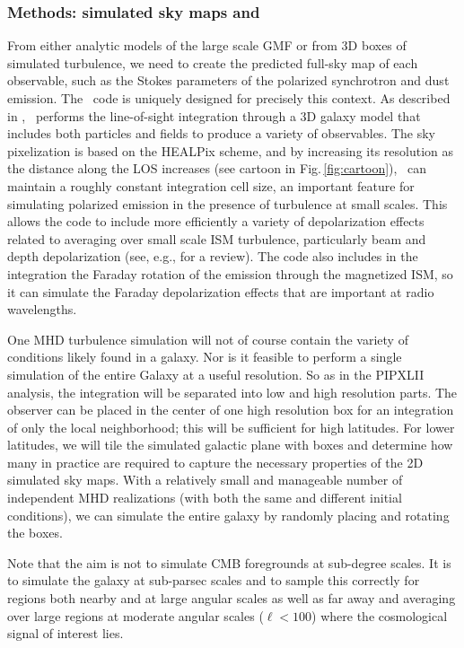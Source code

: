 \subsubsection*{Methods:  simulated sky maps and \hammurabi\ }

From either analytic models of the large scale GMF or from 3D boxes of simulated turbulence, we need to create the predicted full-sky map of each observable, such as the Stokes parameters of the polarized synchrotron and dust emission.  The \hammurabi\ code is uniquely designed for precisely this context. As described in \citet{waelkens:2009}, \hammurabi\ performs the line-of-sight integration through a 3D galaxy model that includes both particles and fields to produce a variety of observables. The sky pixelization is based on the HEALPix scheme, and by increasing its resolution as the distance along the LOS increases (see cartoon in Fig.\,\ref{fig:cartoon}), \hammurabi\ can maintain a roughly constant integration cell size, an important feature for simulating polarized emission in the presence of turbulence at small scales. This allows the code to include more efficiently a variety of depolarization effects related to averaging over small scale ISM turbulence, particularly beam and depth depolarization (see, e.g., \citealt{beck:2015} for a review). The code also includes in the integration the Faraday rotation of the emission through the magnetized ISM, so it can simulate the Faraday depolarization effects that are important at radio wavelengths.

One MHD turbulence simulation will not of course contain the variety of conditions likely found in a galaxy. Nor is it feasible to perform a single simulation of the entire Galaxy at a useful resolution. So as in the PIPXLII analysis, the integration will be separated into low and high resolution parts. The observer can be placed in the center of one high resolution box for an integration of only the local neighborhood; this will be sufficient for high latitudes. For lower latitudes, we will tile the simulated galactic plane with boxes and determine how many in practice are required to capture the necessary properties of the 2D simulated sky maps. With a relatively small and manageable number of independent MHD realizations (with both the same and different initial conditions), we can simulate the entire galaxy by randomly placing and rotating the boxes. 

Note that the aim is not to simulate CMB foregrounds at sub-degree scales.  It is to simulate the galaxy at sub-parsec scales and to sample this correctly for regions both nearby and at large angular scales as well as far away and averaging over large regions at moderate angular scales ($\ell<100$) where the cosmological signal of interest lies.  

